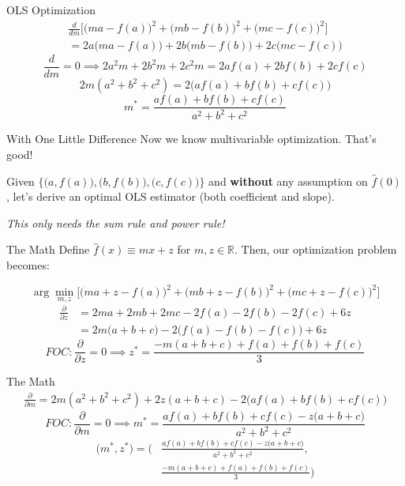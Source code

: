 \documentclass[10pt]{beamer}
\begin{document}
\begin{frame}{OLS Optimization}
    \begin{align*}
        \frac{d}{dm}\Bigg[ \Big(ma - f(a) \Big)^2 + \Big(mb - f(b)\Big)^2 + \Big(mc - f(c)\Big)^2 \Bigg] \\= 2a\Big(ma-f(a)\Big) + 2b\Big(mb-f(b)\Big) + 2c\Big(mc-f(c)\Big)
    \end{align*}
    \[\frac{d}{dm} = 0 \implies 2a^2m + 2b^2 m + 2c^2m = 2af(a) + 2bf(b) + 2cf(c)\]
    \[2m(a^2 + b^2 + c^2) = 2\Big(af(a) + bf(b) + cf(c) \Big)\]
    \[m^* = \frac{af(a) + bf(b) + cf(c)}{a^2 + b^2 + c^2}\]
\end{frame}


\begin{frame}{With One Little Difference}
    Now we know multivariable optimization. That's good! \\

    \vspace{1cm}

    Given $\bigg\{\Big(a,f(a)\Big), \Big(b, f(b)\Big), \Big(c,f(c)\Big) \bigg\}$ and \textbf{without} any assumption on $\hat{f}(0)$, let's derive an optimal OLS estimator (both coefficient and slope). \\

    \vspace{1cm}

    \textit{This only needs the sum rule and power rule!}
\end{frame}

\begin{frame}{The Math}
    Define $\hat{f}(x) \equiv mx + z$ for $m, z \in \mathbb{R}$. Then, our optimization problem becomes:

    \[\arg\min_{m,z} \Bigg[\Big(ma + z - f(a)\Big)^2  + \Big(mb + z - f(b)\Big)^2 + \Big(mc + z - f(c) \Big)^2\Bigg]\]
    \begin{align*}\frac{\partial}{\partial z} &= 2ma + 2mb + 2mc - 2f(a) - 2f(b) - 2f(c) + 6z \\ &=2m\Big(a + b + c\Big) - 2\Big( f(a) - f(b) - f(c) \Big) + 6z
    \end{align*}
    \[FOC: \frac{\partial}{\partial z} = 0 \implies z^* = \frac{-m(a+b+c) + f(a) + f(b) + f(c)}{3}\]
\end{frame}

\begin{frame}{The Math}
    \begin{align*}
    \frac{\partial}{\partial m} = 2m(a^2+b^2+c^2) + 2z(a+b+c) - 2\Big(af(a) + bf(b) + cf(c)\Big)
    \end{align*}
    \[FOC: \frac{\partial}{\partial m} = 0 \implies m^* = \frac{af(a) + bf(b) + cf(c) - z\Big(a+b+c\Big)}{a^2 + b^2 + c^2}\]
    \begin{align*}
        \Big(m^*, z^* \Big) = \Bigg(&\frac{af(a) + bf(b) + cf(c) - z\Big(a+b+c\Big)}{a^2 + b^2 + c^2}, \\ &\frac{-m(a+b+c) + f(a) + f(b) + f(c)}{3}\Bigg)
    \end{align*}
\end{frame}
\end{document}
